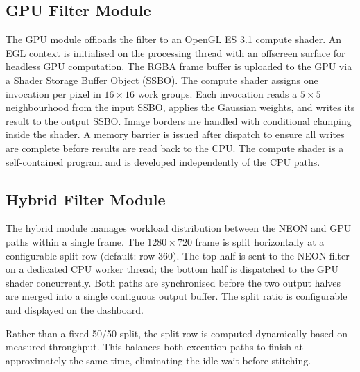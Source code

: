 \documentclass[12pt, a4paper]{article}
\begin{document}
\subsection{GPU Filter Module}
The GPU module offloads the filter to an OpenGL ES 3.1 compute shader. An EGL context is
initialised on the processing thread with an offscreen surface for headless GPU computation.
The RGBA frame buffer is uploaded to the GPU via a Shader Storage Buffer Object (SSBO).
The compute shader assigns one invocation per pixel in $16 \times 16$ work groups. Each
invocation reads a $5 \times 5$ neighbourhood from the input SSBO, applies the Gaussian
weights, and writes its result to the output SSBO. Image borders are handled with conditional
clamping inside the shader. A memory barrier is issued after dispatch to ensure all writes
are complete before results are read back to the CPU. The compute shader is a
self-contained program and is developed independently of the CPU paths.

\subsection{Hybrid Filter Module}
The hybrid module manages workload distribution between the NEON and GPU paths within a single
frame. The $1280 \times 720$ frame is split horizontally at a configurable split row (default:
row 360). The top half is sent to the NEON filter on a dedicated CPU worker thread; the bottom half
is dispatched to the GPU shader concurrently. Both paths are synchronised before the
two output halves are merged into a single contiguous output buffer. The split ratio is
configurable and displayed on the dashboard.

Rather than a fixed 50/50 split, the split row is computed dynamically based on measured
throughput.
This balances both execution paths to finish at approximately the same time, eliminating the
idle wait before stitching.
\end{document}
